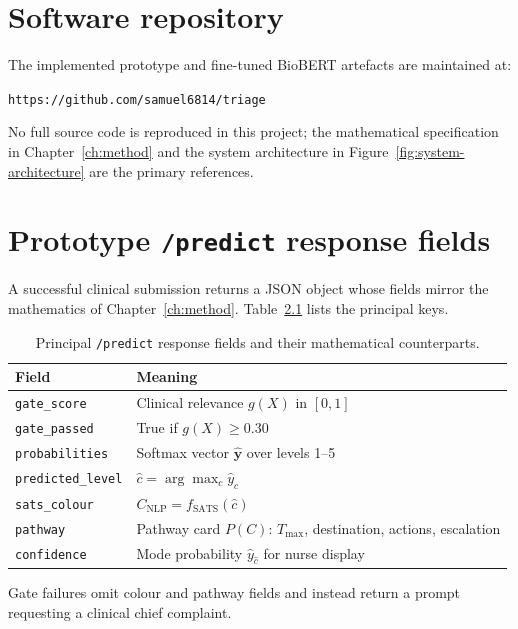 \chapter{Software repository}
\label{app:github}

The implemented prototype and fine-tuned BioBERT artefacts are maintained at:

\texttt{https://github.com/samuel6814/triage}

No full source code is reproduced in this project; the mathematical specification in Chapter~\ref{ch:method} and the system architecture in Figure~\ref{fig:system-architecture} are the primary references.

\chapter{Prototype \texttt{/predict} response fields}

A successful clinical submission returns a JSON object whose fields mirror the mathematics of Chapter~\ref{ch:method}. Table~\ref{tab:api-fields} lists the principal keys.

\begin{table}[H]
\centering
\small
\begin{tabular}{|l|p{9.5cm}|}
\hline
\textbf{Field} & \textbf{Meaning} \\
\hline
\texttt{gate\_score} & Clinical relevance \(g(X)\) in \([0,1]\) \\
\texttt{gate\_passed} & True if \(g(X)\geq 0.30\) \\
\texttt{probabilities} & Softmax vector \(\hat{\mathbf{y}}\) over levels 1--5 \\
\texttt{predicted\_level} & \(\hat{c}=\arg\max_c\hat{y}_c\) \\
\texttt{sats\_colour} & \(C_{\mathrm{NLP}}=f_{\mathrm{SATS}}(\hat{c})\) \\
\texttt{pathway} & Pathway card \(P(C)\): \(T_{\max}\), destination, actions, escalation \\
\texttt{confidence} & Mode probability \(\hat{y}_{\hat{c}}\) for nurse display \\
\hline
\end{tabular}
\caption{Principal \texttt{/predict} response fields and their mathematical counterparts.}
\label{tab:api-fields}
\end{table}

Gate failures omit colour and pathway fields and instead return a prompt requesting a clinical chief complaint.

